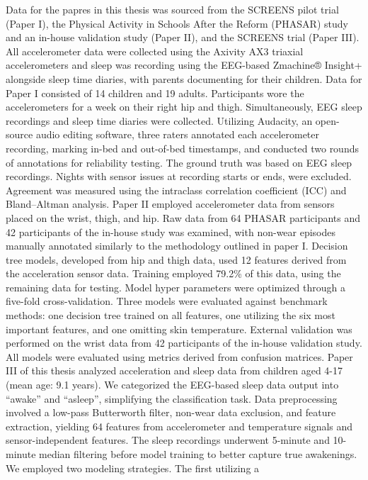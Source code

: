 \documentclass[
  9pt,
]{scrbook}
\begin{document}
Data for the papres in this thesis was sourced from the SCREENS pilot
trial (Paper I), the Physical Activity in Schools After the Reform
(PHASAR) study and an in-house validation study (Paper II), and the
SCREENS trial (Paper III). All accelerometer data were collected using
the Axivity AX3 triaxial accelerometers and sleep was recording using
the EEG-based Zmachine® Insight+ alongside sleep time diaries, with
parents documenting for their children. Data for Paper I consisted of 14
children and 19 adults. Participants wore the accelerometers for a week
on their right hip and thigh. Simultaneously, EEG sleep recordings and
sleep time diaries were collected. Utilizing Audacity, an open-source
audio editing software, three raters annotated each accelerometer
recording, marking in-bed and out-of-bed timestamps, and conducted two
rounds of annotations for reliability testing. The ground truth was
based on EEG sleep recordings. Nights with sensor issues at recording
starts or ends, were excluded. Agreement was measured using the
intraclass correlation coefficient (ICC) and Bland--Altman analysis.
Paper II employed accelerometer data from sensors placed on the wrist,
thigh, and hip. Raw data from 64 PHASAR participants and 42 participants
of the in-house study was examined, with non-wear episodes manually
annotated similarly to the methodology outlined in paper I. Decision
tree models, developed from hip and thigh data, used 12 features derived
from the acceleration sensor data. Training employed 79.2\% of this
data, using the remaining data for testing. Model hyper parameters were
optimized through a five-fold cross-validation. Three models were
evaluated against benchmark methods: one decision tree trained on all
features, one utilizing the six most important features, and one
omitting skin temperature. External validation was performed on the
wrist data from 42 participants of the in-house validation study. All
models were evaluated using metrics derived from confusion matrices.
Paper III of this thesis analyzed acceleration and sleep data from
children aged 4-17 (mean age: 9.1 years). We categorized the EEG-based
sleep data output into ``awake'' and ``asleep'', simplifying the
classification task. Data preprocessing involved a low-pass Butterworth
filter, non-wear data exclusion, and feature extraction, yielding 64
features from accelerometer and temperature signals and
sensor-independent features. The sleep recordings underwent 5-minute and
10-minute median filtering before model training to better capture true
awakenings. We employed two modeling strategies. The first utilizing a
\end{document}
